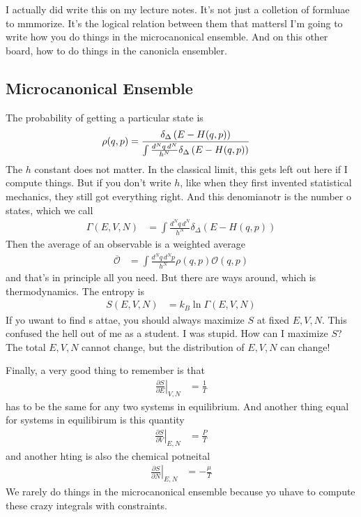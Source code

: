 I actually did write this on my lecture notes.
It's not just a colletion of formluae to mmmorize.
It's the logical relation between them that mattersl
I'm going to write how you do things in the microcanonical ensemble.
And on this other board,
how to do things in the canonicla ensembler.

\subsection{Microcanonical Ensemble}
The probability of getting a particular state is
\begin{align}
    \rho(q, p) &=
    \frac{\delta_\Delta\left( E - H(q, p) \right)}{%
        \int \frac{d^Nq\, d^N}{h^N} \delta_\Delta\left( E - H(q, p) \right)
    }
\end{align}
The $h$ constant does not matter.
In the classical limit,
this gets left out here if I compute things.
But if you don't write $h$,
like when they first invented statistical mechanics,
they still got everything right.
And this denomianotr is the number o states,
which we call
\begin{align}
    \Gamma(E,V,N) &=
    \int \frac{d^Nq\, d^N}{h^N} \delta_\Delta\left( E - H(q, p) \right)
\end{align}
Then the average of an observable is a weighted average
\begin{align}
    \overline{\mathcal{O}}
    &=
    \int \frac{d^Nq \, d^Np}{h^N}
    \rho(q, p) \mathcal{O}(q, p)
\end{align}
and that's in principle all you need.
But there are ways around,
which is thermodynamics.
The entropy is
\begin{align}
    S(E,V,N) &=
    k_B \ln \Gamma(E, V, N)
\end{align}
If yo uwant to find s attae,
you should always maximize $S$ at fixed $E,V,N$.
This confused the hell out of me as a student.
I was stupid.
How can I maximize $S$?
The total $E,V,N$ cannot change,
but the distribution of $E,V,N$ can change!

Finally, a very good thing to remember is that
\begin{align}
    \left.\frac{\partial S}{\partial E}\right|_{V,N} &= \frac{1}{T}
\end{align}
has to be the same for any two systems in equilibrium.
And another thing equal for systems in equilibirum is this quantity
\begin{align}
    \left.\frac{\partial S}{\partial V}\right|_{E,N} &= \frac{P}{T}
\end{align}
and another hting is also the chemical potneital
\begin{align}
    \left.\frac{\partial S}{\partial N}\right|_{E,N} &=
    -\frac{\mu}{T}
\end{align}
We rarely do things in the microcanonical ensemble because yo uhave to compute
these crazy integrals with constraints.


